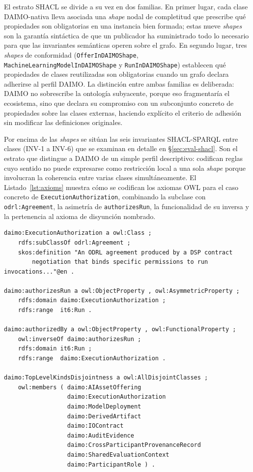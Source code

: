 \documentclass[Afour,sagev,times]{sagej}
\newcommand{\code}[1]{\texttt{#1}}
\begin{document}
El estrato SHACL se divide a su vez en dos familias. En primer lugar, cada clase DAIMO-nativa lleva asociada una \emph{shape} nodal de completitud que prescribe qué propiedades son obligatorias en una instancia bien formada; estas nueve \emph{shapes} son la garantía sintáctica de que un publicador ha suministrado todo lo necesario para que las invariantes semánticas operen sobre el grafo. En segundo lugar, tres \emph{shapes} de conformidad (\code{OfferInDAIMOShape}, \code{MachineLearningModelInDAIMOShape} y \code{RunInDAIMOShape}) establecen qué propiedades de clases reutilizadas son obligatorias cuando un grafo declara adherirse al perfil DAIMO. La distinción entre ambas familias es deliberada: DAIMO no sobrescribe la ontología subyacente, porque eso fragmentaría el ecosistema, sino que declara su compromiso con un subconjunto concreto de propiedades sobre las clases externas, haciendo explícito el criterio de adhesión sin modificar las definiciones originales.

Por encima de las \emph{shapes} se sitúan las seis invariantes SHACL-SPARQL entre clases (INV-1 a INV-6) que se examinan en detalle en §\ref{sec:eval-shacl}. Son el estrato que distingue a DAIMO de un simple perfil descriptivo: codifican reglas cuyo sentido no puede expresarse como restricción local a una sola \emph{shape} porque involucran la coherencia entre varias clases simultáneamente. El Listado~\ref{lst:axioms} muestra cómo se codifican los axiomas OWL para el caso concreto de \code{ExecutionAuthorization}, combinando la subclase con \code{odrl:Agreement}, la asimetría de \code{authorizesRun}, la funcionalidad de su inversa y la pertenencia al axioma de disyunción nombrado.

\begin{lstlisting}[label=lst:axioms,caption={Axiomas centrales alrededor de \code{ExecutionAuthorization}.}]
daimo:ExecutionAuthorization a owl:Class ;
    rdfs:subClassOf odrl:Agreement ;
    skos:definition "An ODRL agreement produced by a DSP contract
        negotiation that binds specific permissions to run invocations..."@en .

daimo:authorizesRun a owl:ObjectProperty , owl:AsymmetricProperty ;
    rdfs:domain daimo:ExecutionAuthorization ;
    rdfs:range  it6:Run .

daimo:authorizedBy a owl:ObjectProperty , owl:FunctionalProperty ;
    owl:inverseOf daimo:authorizesRun ;
    rdfs:domain it6:Run ;
    rdfs:range  daimo:ExecutionAuthorization .

daimo:TopLevelKindsDisjointness a owl:AllDisjointClasses ;
    owl:members ( daimo:AIAssetOffering
                  daimo:ExecutionAuthorization
                  daimo:ModelDeployment
                  daimo:DerivedArtifact
                  daimo:IOContract
                  daimo:AuditEvidence
                  daimo:CrossParticipantProvenanceRecord
                  daimo:SharedEvaluationContext
                  daimo:ParticipantRole ) .
\end{lstlisting}
\end{document}
